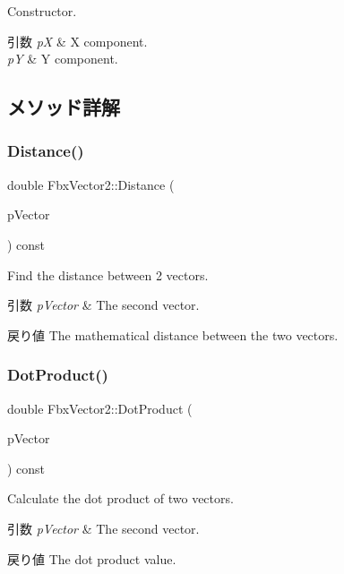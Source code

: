 Constructor. 
\begin{DoxyParams}{引数}
{\em pX} & X component. \\
\hline
{\em pY} & Y component. \\
\hline
\end{DoxyParams}


\subsection{メソッド詳解}
\mbox{\label{class_fbx_vector2_a95b732ce313c7afc59b5e7f4f804a955}} 
\subsubsection{\texorpdfstring{Distance()}{Distance()}}
{\footnotesize\ttfamily double Fbx\+Vector2\+::\+Distance (\begin{DoxyParamCaption}\item[{const \hyperlink{class_fbx_vector2}{Fbx\+Vector2} \&}]{p\+Vector }\end{DoxyParamCaption}) const}

Find the distance between 2 vectors. 
\begin{DoxyParams}{引数}
{\em p\+Vector} & The second vector. \\
\hline
\end{DoxyParams}
\begin{DoxyReturn}{戻り値}
The mathematical distance between the two vectors. 
\end{DoxyReturn}
\mbox{\label{class_fbx_vector2_a78b87568a55f7cf9f38694367e640fae}} 
\subsubsection{\texorpdfstring{Dot\+Product()}{DotProduct()}}
{\footnotesize\ttfamily double Fbx\+Vector2\+::\+Dot\+Product (\begin{DoxyParamCaption}\item[{const \hyperlink{class_fbx_vector2}{Fbx\+Vector2} \&}]{p\+Vector }\end{DoxyParamCaption}) const}

Calculate the dot product of two vectors. 
\begin{DoxyParams}{引数}
{\em p\+Vector} & The second vector. \\
\hline
\end{DoxyParams}
\begin{DoxyReturn}{戻り値}
The dot product value. 
\end{DoxyReturn}
\mbox{\label{class_fbx_vector2_a1045bf41d94e9bce617163959fae50ba}} 

